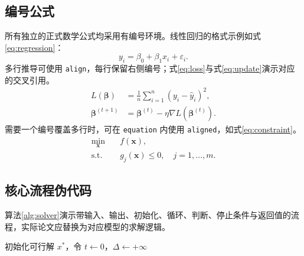 \subsection{编号公式}
所有独立的正式数学公式均采用有编号环境。线性回归的格式示例如式\eqref{eq:regression}：
\begin{equation}
  y_i=\beta_0+\beta_1x_i+\varepsilon_i.
  \label{eq:regression}
\end{equation}
多行推导可使用 \texttt{align}，每行保留右侧编号；式\eqref{eq:loss}与式\eqref{eq:update}演示对应的交叉引用。
\begin{align}
  L(\bm\beta)&=\frac{1}{n}\sum_{i=1}^{n}(y_i-\hat y_i)^2,\label{eq:loss}\\
  \bm\beta^{(t+1)}&=\bm\beta^{(t)}-\eta\nabla L(\bm\beta^{(t)}).\label{eq:update}
\end{align}
需要一个编号覆盖多行时，可在 \texttt{equation} 内使用 \texttt{aligned}，如式\eqref{eq:constraint}。
\begin{equation}\label{eq:constraint}
  \begin{aligned}
    \min_{\bm x}\quad & f(\bm x),\\
    \text{s.t.}\quad & g_j(\bm x)\le 0,\quad j=1,\ldots,m.
  \end{aligned}
\end{equation}
\subsection{核心流程伪代码}
算法\ref{alg:solver}演示带输入、输出、初始化、循环、判断、停止条件与返回值的流程，实际论文应替换为对应模型的求解逻辑。
\begin{algorithm}[H]
  初始化可行解 $x^*$，令 $t\leftarrow 0$，$\Delta\leftarrow+\infty$\;
  \;
  \caption{带收敛停止条件的迭代求解流程}\label{alg:solver}
\end{algorithm}
